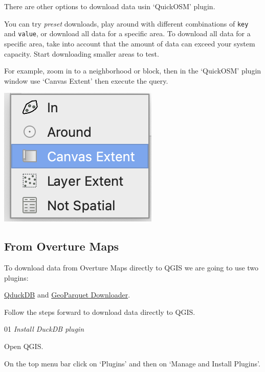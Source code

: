 \documentclass[
  letterpaper,
  DIV=11,
  numbers=noendperiod]{scrartcl}
\begin{document}
\begin{tcolorbox}[enhanced jigsaw, opacitybacktitle=0.6, colframe=quarto-callout-caution-color-frame, arc=.35mm, leftrule=.75mm, toptitle=1mm, opacityback=0, titlerule=0mm, breakable, colback=white, colbacktitle=quarto-callout-caution-color!10!white, toprule=.15mm, bottomtitle=1mm, coltitle=black, title=\textcolor{quarto-callout-caution-color}{\faFire}\hspace{0.5em}{Go further}, left=2mm, rightrule=.15mm, bottomrule=.15mm]

There are other options to download data usin `QuickOSM' plugin.

You can try \emph{preset} downloads, play around with different
combinations of \texttt{key} and \texttt{value}, or download all data
for a specific area. To download all data for a specific area, take into
account that the amount of data can exceed your system capacity. Start
downloading smaller areas to test.

For example, zoom in to a neighborhood or block, then in the `QuickOSM'
plugin window use `Canvas Extent' then execute the query.

\includegraphics[width=0.2\linewidth,height=\textheight,keepaspectratio]{./images/canvas.png}

\end{tcolorbox}

\subsection{From Overture Maps}\label{from-overture-maps}

To download data from Overture Maps directly to QGIS we are going to use
two plugins:

\href{https://plugins.qgis.org/plugins/qduckdb/}{QduckDB} and
\href{https://plugins.qgis.org/plugins/qgis_plugin_gpq_downloader/}{GeoParquet
Downloader}.

Follow the steps forward to download data directly to QGIS.

{01} \emph{Install DuckDB plugin}

Open QGIS.

On the top menu bar click on `Plugins' and then on `Manage and Install
Plugins'.
\end{document}
